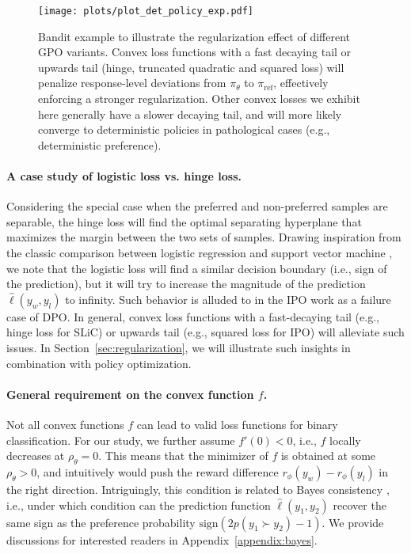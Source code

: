 \begin{figure*}[t]
    \centering
    \texttt{[image: plots/plot\_det\_policy\_exp.pdf]}
    \caption{\small{Bandit example \citep{azar2023general} to illustrate the regularization effect of different GPO variants. Convex loss functions with a fast decaying tail or upwards tail (hinge, truncated quadratic and squared loss) will penalize response-level deviations from $\pi_\theta$ to $\pi_\text{ref}$, effectively enforcing a stronger regularization. Other convex losses we exhibit here generally have a slower decaying tail, and will more likely converge to deterministic policies in pathological cases (e.g., deterministic preference).}}
\end{figure*}

\paragraph{A case study of logistic loss vs. hinge loss.} 

Considering the special case when the preferred and non-preferred samples are separable, the hinge loss will find the optimal separating hyperplane that maximizes the margin between the two sets of samples. Drawing inspiration from the classic comparison between logistic regression and support vector machine \citep{hastie2009elements}, we note that the logistic loss will find a similar decision boundary (i.e., sign of the prediction), but it will try to increase the magnitude of the prediction $\hat{\ell}(y_w,y_l)$ to infinity. Such behavior is alluded to in the IPO work \citep{azar2023general} as a failure case of DPO. In general, convex loss functions with a fast-decaying tail (e.g., hinge loss for SLiC) or upwards tail (e.g., squared loss for IPO) will alleviate such issues. In Section~\ref{sec:regularization}, we will illustrate such insights in combination with policy optimization.

\paragraph{General requirement on the convex function $f$.} Not all convex functions $f$ can lead to valid loss functions for binary classification. For our study, we further assume $f'(0)<0$, i.e., $f$ locally decreases at $\rho_\theta=0$. This means that the minimizer of $f$ is obtained at some $\rho_\theta>0$, and intuitively would push the reward difference $r_\phi(y_w)-r_\phi(y_l)$ in the right direction. Intriguingly, this condition is related to Bayes consistency \citep{rosasco2004loss,bartlett2006convexity}, i.e., under which condition can the prediction function $\hat{\ell}(y_1,y_2)$ recover the same sign as the preference probability $\text{sign}\left(2p(y_1\succ y_2)-1\right)$. We provide discussions for interested readers in Appendix~\ref{appendix:bayes}.

